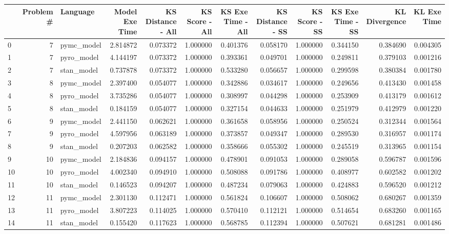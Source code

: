 \begin{tabular}{lrlrrrrrrrrr}
\toprule
 & Problem # & Language & Model Exe Time & KS Distance - All & KS Score - All & KS Exe Time - All & KS Distance - SS & KS Score - SS & KS Exe Time - SS & KL Divergence & KL Exe Time \\
\midrule
0 & 7 & pymc_model & 2.814872 & 0.073372 & 1.000000 & 0.401376 & 0.058170 & 1.000000 & 0.344150 & 0.384690 & 0.004305 \\
1 & 7 & pyro_model & 4.144197 & 0.073372 & 1.000000 & 0.393361 & 0.049701 & 1.000000 & 0.249811 & 0.379103 & 0.001216 \\
2 & 7 & stan_model & 0.737878 & 0.073372 & 1.000000 & 0.533280 & 0.056657 & 1.000000 & 0.299598 & 0.380384 & 0.001780 \\
3 & 8 & pymc_model & 2.397400 & 0.054077 & 1.000000 & 0.342886 & 0.034617 & 1.000000 & 0.249656 & 0.413430 & 0.001458 \\
4 & 8 & pyro_model & 3.735286 & 0.054077 & 1.000000 & 0.308997 & 0.044298 & 1.000000 & 0.253909 & 0.413179 & 0.001612 \\
5 & 8 & stan_model & 0.184159 & 0.054077 & 1.000000 & 0.327154 & 0.044633 & 1.000000 & 0.251979 & 0.412979 & 0.001220 \\
6 & 9 & pymc_model & 2.441150 & 0.062621 & 1.000000 & 0.361658 & 0.058956 & 1.000000 & 0.250524 & 0.312344 & 0.001564 \\
7 & 9 & pyro_model & 4.597956 & 0.063189 & 1.000000 & 0.373857 & 0.049347 & 1.000000 & 0.289530 & 0.316957 & 0.001174 \\
8 & 9 & stan_model & 0.207203 & 0.062582 & 1.000000 & 0.358666 & 0.055302 & 1.000000 & 0.245519 & 0.313965 & 0.001154 \\
9 & 10 & pymc_model & 2.184836 & 0.094157 & 1.000000 & 0.478901 & 0.091053 & 1.000000 & 0.289058 & 0.596787 & 0.001596 \\
10 & 10 & pyro_model & 4.002340 & 0.094910 & 1.000000 & 0.508088 & 0.091786 & 1.000000 & 0.408977 & 0.602582 & 0.001202 \\
11 & 10 & stan_model & 0.146523 & 0.094207 & 1.000000 & 0.487234 & 0.079063 & 1.000000 & 0.424883 & 0.596520 & 0.001212 \\
12 & 11 & pymc_model & 2.301130 & 0.112471 & 1.000000 & 0.561824 & 0.106607 & 1.000000 & 0.508062 & 0.680267 & 0.001359 \\
13 & 11 & pyro_model & 3.807223 & 0.114025 & 1.000000 & 0.570410 & 0.112121 & 1.000000 & 0.514654 & 0.683260 & 0.001165 \\
14 & 11 & stan_model & 0.155420 & 0.117623 & 1.000000 & 0.568785 & 0.112394 & 1.000000 & 0.507621 & 0.681281 & 0.001486 \\

\end{tabular}
